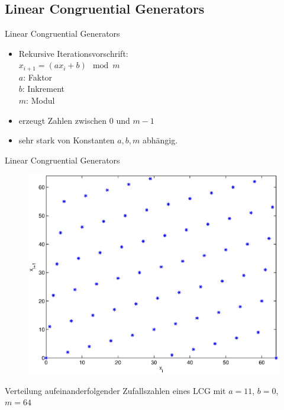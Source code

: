 \documentclass{beamer}
\begin{document}
\subsection{Linear Congruential Generators}
\begin{frame}{Linear Congruential Generators}
	\begin{itemize}
		\item Rekursive Iterationsvorschrift: \\
				\hspace{1cm}$x_{i+1} = \left( a x_{i} + b \right) \mod{m}$ \\
				\hspace{1.5cm}$a$: Faktor\\
				\hspace{1.5cm}$b$: Inkrement\\
				\hspace{1.5cm}$m$: Modul
		\item erzeugt Zahlen zwischen $0$ und $m-1$
		\item sehr stark von Konstanten $a,b,m$ abhängig.
	\end{itemize}
\end{frame}
\begin{frame}{Linear Congruential Generators}
	\begin{figure}[h]
		\centering
		\includegraphics[width=0.7\linewidth]{images/lcg.eps}
	\end{figure}
	Verteilung aufeinanderfolgender Zufallszahlen eines LCG mit $a=11$, $b=0$, $m=64$
\end{frame}
\end{document}
